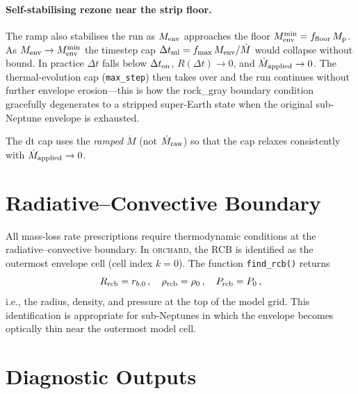 \documentclass{aastex701}
\newcommand{\Mdot}{\dot{M}}
\newcommand{\Menv}{M_{\rm env}}
\newcommand{\Mp}{M_{\rm p}}
\newcommand{\Rrcb}{R_{\rm rcb}}
\newcommand{\orchard}{\textsc{orchard}}
\begin{document}
\paragraph{Self-stabilising rezone near the strip floor.}  The ramp
also stabilises the run as $\Menv$ approaches the floor
$\Menv^{\rm min} = f_{\rm floor}\,\Mp$.  As $\Menv\to\Menv^{\rm min}$
the timestep cap $\Delta t_{\rm ml} = f_{\rm max}\,\Menv/\Mdot$ would
collapse without bound.  In practice $\Delta t$ falls below
$\Delta t_{\rm on}$, $R(\Delta t) \to 0$, and $\Mdot_{\rm applied}\to
0$.  The thermal-evolution cap (\texttt{max\_step}) then takes over and
the run continues without further envelope erosion---this is how the
rock\_gray boundary condition gracefully degenerates to a stripped
super-Earth state when the original sub-Neptune envelope is exhausted.

The dt cap uses the \emph{ramped} $\Mdot$ (not $\Mdot_{\rm raw}$) so
that the cap relaxes consistently with $\Mdot_{\rm applied}\to 0$.

\section{Radiative--Convective Boundary}\label{sec:rcb}

All mass-loss rate prescriptions require thermodynamic conditions at the
radiative--convective boundary.  In \orchard{}, the RCB is identified as
the outermost envelope cell (cell index $k = 0$).  The function
\texttt{find\_rcb()} returns
\begin{equation}
  \Rrcb = r_{b,0}\,,\quad
  \rho_{\rm rcb} = \rho_{0}\,,\quad
  P_{\rm rcb} = P_{0}\,,
\end{equation}
i.e., the radius, density, and pressure at the top of the model grid.
This identification is appropriate for sub-Neptunes in which the
envelope becomes optically thin near the outermost model cell.

\section{Diagnostic Outputs}\label{sec:diagnostics}
\end{document}
